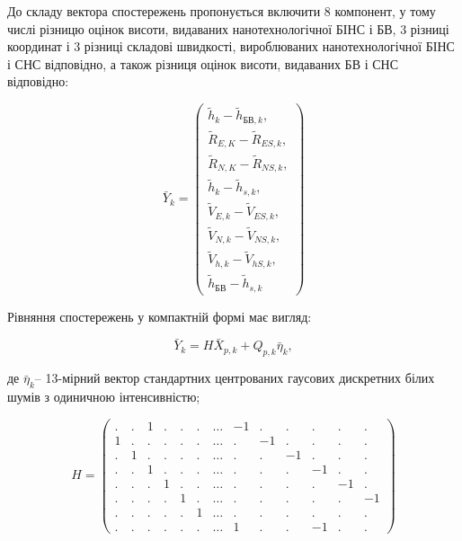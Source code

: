 До 
складу вектора спостережень  пропонується включити 8 компонент, у тому числі різницю 
оцінок висоти, видаваних  нанотехнологічної БІНС   і БВ, 3 різниці координат і 3 
різниці складові швидкості, вироблюваних нанотехнологічної БІНС і СНС відповідно, 
а також різниця оцінок висоти, видаваних БВ і СНС відповідно:

\begin{equation} 
\label{eq:measure_vector} 
\bar{Y}_{k} = 
\left(\begin{array}{l}
{\tilde{h}_{k} -\tilde{h}_{\text{БВ},k},}\\
{\tilde{R}_{E,K} -\tilde{R}_{ES,k},}\\
{\tilde{R}_{N,K} -\tilde{R}_{NS,k},}\\
{\tilde{h}_{k} -\tilde{h}_{s,k},}\\
{\tilde{V}_{E,k} -\tilde{V}_{ES,k},}\\
{\tilde{V}_{N,k} -\tilde{V}_{NS,k},}\\
{\tilde{V}_{h,k} -\tilde{V}_{hS,k},}\\
{\tilde{h}_{\text{БВ}} -\tilde{h}_{s,k}}
\end{array} \right)  
\end{equation} 

Рівняння спостережень у компактній  формі має вигляд:

\[\bar{Y}_{k} =H\bar{X}_{p,k} +Q_{p,k} \bar{\eta }_{k} ,\] 

де $\bar{\eta }_{k} $-- 13-мірний вектор стандартних центрованих гаусових дискретних 
білих шумів з одиничною інтенсивністю;

\[H=\left(\begin{array}{ccccccccccccc}    
{.} & {.} & {1} & {.} & {.} & {.} & {\ldots } & {-1} & {.} & {.} & {.} & {.} & {.} \\ 
{1} & {.} & {.} & {.} & {.} & {.} & {\ldots } & {.} & {-1} & {.} & {.} & {.} & {.} \\ 
{.} & {1} & {.} & {.} & {.} & {.} & {\ldots } & {.} & {.} & {-1} & {.} & {.} & {.} \\ 
{.} & {.} & {1} & {.} & {.} & {.} & {\ldots } & {.} & {.} & {.} & {-1} & {.} & {.} \\ 
{.} & {.} & {.} & {1} & {.} & {.} & {\ldots } & {.} & {.} & {.} & {.} & {-1} & {.} \\ 
{.} & {.} & {.} & {.} & {1} & {.} & {\ldots } & {.} & {.} & {.} & {.} & {.} & {-1} \\ 
{.} & {.} & {.} & {.} & {.} & {1} & {\ldots } & {.} & {.} & {.} & {.} & {.} & {.} \\ 
{.} & {.} & {.} & {.} & {.} & {.} & {\ldots } & {1} & {.} & {.} & {-1} & {.} & {.} 
\end{array}\right)\] 

